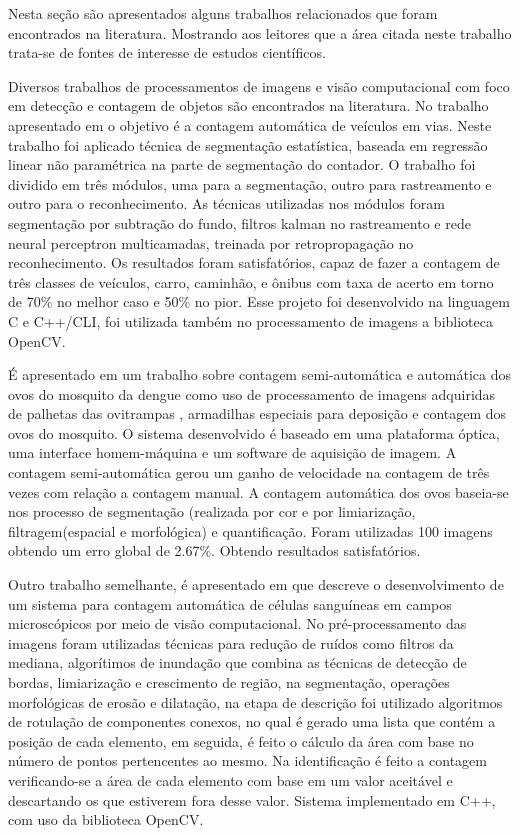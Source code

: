 Nesta seção são apresentados alguns trabalhos relacionados que foram encontrados na literatura. Mostrando aos leitores que a área citada neste trabalho trata-se de fontes de interesse de estudos científicos.

Diversos trabalhos de processamentos de imagens e visão computacional com foco em detecção e contagem de objetos são encontrados na literatura. No trabalho apresentado em \cite{SANTOS2013}  o objetivo é a contagem automática de veículos em vias. Neste trabalho foi aplicado técnica de segmentação estatística, baseada em regressão linear não paramétrica na parte de segmentação do contador. O trabalho foi dividido em três módulos, uma para a segmentação, outro para rastreamento e outro para o reconhecimento. As técnicas utilizadas nos módulos foram segmentação por subtração do fundo, filtros kalman no rastreamento e rede neural perceptron multicamadas, treinada por retropropagação no reconhecimento. Os resultados foram satisfatórios, capaz de fazer a contagem de três classes de veículos, carro, caminhão, e ônibus com taxa de acerto em torno de 70\% no melhor caso e 50\% no pior. Esse projeto foi desenvolvido na linguagem C e C++/CLI, foi utilizada também no processamento de imagens a biblioteca OpenCV.

É apresentado em \cite{SILVA2012} um trabalho sobre contagem semi-automática e automática dos ovos do mosquito da dengue como uso de processamento de imagens adquiridas de palhetas das ovitrampas , armadilhas especiais para deposição e contagem dos ovos do mosquito. O sistema desenvolvido é baseado em uma plataforma óptica, uma interface homem-máquina e um software de aquisição de imagem. A contagem semi-automática gerou um ganho de velocidade na contagem  de três vezes com relação a contagem manual. A contagem automática dos ovos baseia-se nos processo de segmentação (realizada por cor e por limiarização, filtragem(espacial e morfológica) e quantificação. Foram utilizadas 100 imagens obtendo um erro global de 2.67\%. Obtendo resultados satisfatórios.

Outro trabalho semelhante, é apresentado em \cite{BANKE2012} que descreve o desenvolvimento de um sistema para contagem automática de células sanguíneas em campos microscópicos por meio de visão computacional. No pré-processamento das imagens foram utilizadas técnicas para redução de ruídos como filtros da mediana, algorítimos de inundação que combina as técnicas de detecção de bordas, limiarização e crescimento de região, na segmentação, operações morfológicas de erosão e dilatação, na etapa de descrição foi utilizado algoritmos de rotulação de componentes conexos, no qual é gerado uma lista que contém a posição de cada elemento, em seguida, é feito o cálculo da área com base no número de pontos pertencentes ao mesmo. Na identificação é feito a contagem verificando-se a área de cada elemento com base em um valor aceitável e descartando os que estiverem fora desse valor. 
Sistema implementado em C++, com uso da biblioteca OpenCV.

